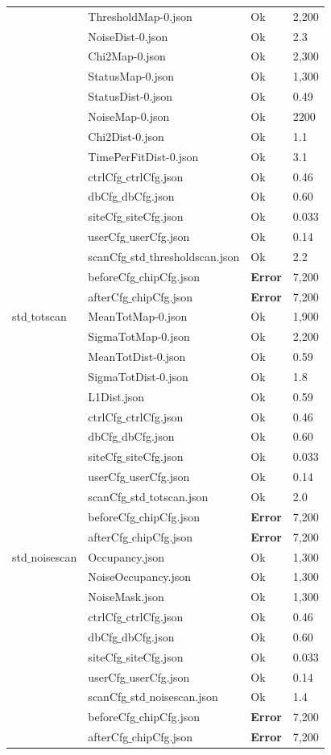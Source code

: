\begin{longtable}{|llll|}
   & ThresholdMap-0.json & Ok & 2,200 \\
   & NoiseDist-0.json & Ok & 2.3 \\
   & Chi2Map-0.json & Ok & 2,300 \\
   & StatusMap-0.json & Ok & 1,300 \\
   & StatusDist-0.json & Ok & 0.49 \\
   & NoiseMap-0.json & Ok & 2200 \\
   & Chi2Dist-0.json & Ok & 1.1 \\
   & TimePerFitDist-0.json & Ok & 3.1 \\
   & ctrlCfg$\_$ctrlCfg.json & Ok & 0.46 \\
   & dbCfg$\_$dbCfg.json & Ok & 0.60 \\
   & siteCfg$\_$siteCfg.json & Ok & 0.033 \\
   & userCfg$\_$userCfg.json & Ok & 0.14 \\
   & scanCfg$\_$std$\_$thresholdscan.json & Ok & 2.2 \\
   & beforeCfg$\_$chipCfg.json & { \bf Error} & 7,200 \\
   & afterCfg$\_$chipCfg.json & { \bf Error} & 7,200 \\
  \hline
  std$\_$totscan & MeanTotMap-0.json & Ok & 1,900 \\
   & SigmaTotMap-0.json & Ok & 2,200 \\
   & MeanTotDist-0.json & Ok & 0.59 \\
   & SigmaTotDist-0.json & Ok & 1.8 \\
   & L1Dist.json & Ok & 0.59 \\
   & ctrlCfg$\_$ctrlCfg.json & Ok & 0.46 \\
   & dbCfg$\_$dbCfg.json & Ok & 0.60 \\
   & siteCfg$\_$siteCfg.json & Ok & 0.033 \\
   & userCfg$\_$userCfg.json & Ok & 0.14 \\
   & scanCfg$\_$std$\_$totscan.json & Ok & 2.0 \\
   & beforeCfg$\_$chipCfg.json & { \bf Error} & 7,200 \\
   & afterCfg$\_$chipCfg.json & { \bf Error} & 7,200 \\
  \hline
  std$\_$noisescan & Occupancy.json & Ok & 1,300 \\
   & NoiseOccupancy.json & Ok & 1,300 \\
   & NoiseMask.json & Ok & 1,300 \\
   & ctrlCfg$\_$ctrlCfg.json & Ok & 0.46 \\
   & dbCfg$\_$dbCfg.json & Ok & 0.60 \\
   & siteCfg$\_$siteCfg.json & Ok & 0.033 \\
   & userCfg$\_$userCfg.json & Ok & 0.14 \\
   & scanCfg$\_$std$\_$noisescan.json & Ok & 1.4 \\
   & beforeCfg$\_$chipCfg.json & { \bf Error} & 7,200 \\
   & afterCfg$\_$chipCfg.json & { \bf Error} & 7,200 \\
  \hline
\end{longtable}


